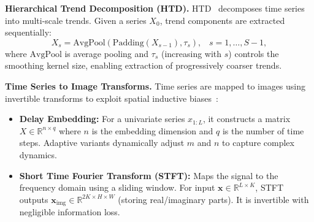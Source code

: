 \textbf{Hierarchical Trend Decomposition (HTD).}
HTD~\cite{shen_multi-resolution_2024} decomposes time series into multi-scale trends. Given a series $X_0$, trend components are extracted sequentially:
\begin{equation}\label{eq:treand_extraction}
    X_s = \text{AvgPool}(\text{Padding}(X_{s-1}), \tau_s), \;\;\; s=1,\dots,S-1,
\end{equation}
where $\text{AvgPool}$ is average pooling and $\tau_s$ (increasing with $s$) controls the smoothing kernel size, enabling extraction of progressively coarser trends.

\textbf{Time Series to Image Transforms.}
Time series are mapped to images using invertible transforms to exploit spatial inductive biases~\cite{takens2006detecting,DBLP:conf/icassp/GriffinL83}:
\begin{itemize}
    \item \textbf{Delay Embedding:} For a univariate series $x_{1:L}$, it constructs a matrix $X \in \mathbb{R}^{n \times q}$ where $n$ is the embedding dimension and $q$ is the number of time steps. Adaptive variants dynamically adjust $m$ and $n$ to capture complex dynamics.
    \item \textbf{Short Time Fourier Transform (STFT):} Maps the signal to the frequency domain using a sliding window. For input $\mathbf{x} \in \mathbb{R}^{L \times K}$, STFT outputs $\mathbf{x}_{\text{img}} \in \mathbb{R}^{2K \times H \times W}$ (storing real/imaginary parts). It is invertible with negligible information loss.
\end{itemize}
\noindent
